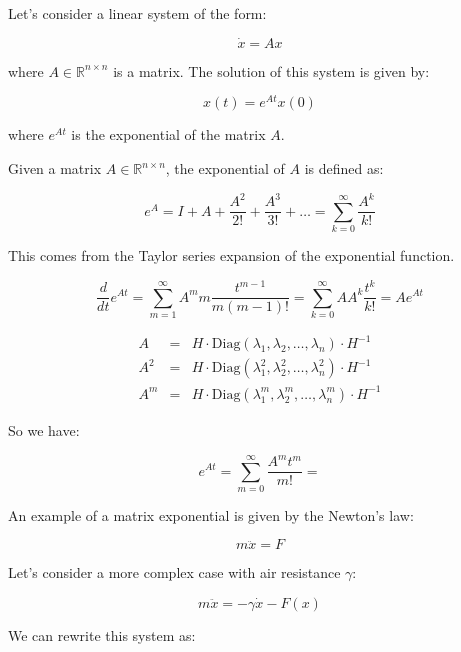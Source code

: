 Let's consider a linear system of the form:

$$
\dot x = Ax
$$

where $A \in \mathbb{R}^{n \times n}$ is a matrix. The solution of this system is given by:

$$
x(t) = e^{At} x(0)
$$

where $e^{At}$ is the exponential of the matrix $A$.

\begin{definitionblock}
Given a matrix $A \in \mathbb{R}^{n \times n}$, the exponential of $A$ is defined as:

$$
e^A = I + A + \frac{A^2}{2!} + \frac{A^3}{3!} + \dots = \sum_{k=0}^{\infty} \frac{A^k}{k!}
$$

This comes from the Taylor series expansion of the exponential function.
\end{definitionblock}

$$
\dfrac d{dt} e^{At} = \sum_{m = 1}^\infty A^m m \dfrac{t^{m-1}}{m(m-1)!}
= \sum_{k = 0}^\infty A A^k \dfrac{t^k}{k!}
= A e^{At}
$$

$$
\begin{array}{lll}
A & = & H \cdot \text{Diag}(\lambda_1, \lambda_2, \dots, \lambda_n) \cdot H^{-1} \\
A^2 & = & H \cdot \text{Diag}(\lambda_1^2, \lambda_2^2, \dots, \lambda_n^2) \cdot H^{-1} \\
A^m & = & H \cdot \text{Diag}(\lambda_1^m, \lambda_2^m, \dots, \lambda_n^m) \cdot H^{-1}
\end{array}
$$

So we have:

$$
e^{At} = \sum_{m = 0} ^ \infty \dfrac{A^m t^m}{m!} = 
$$

\newpage

An example of a matrix exponential is given by the Newton's law:

$$
m \ddot x = F
$$

Let's consider a more complex case with air resistance $\gamma$:

$$
m \ddot x = - \gamma \dot x - F(x)
$$

We can rewrite this system as:

